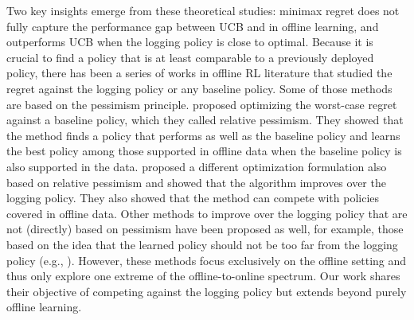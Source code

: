 Two key insights emerge from these theoretical studies:
minimax regret does not fully capture the performance gap between UCB and \alglcb in offline learning, and \alglcb outperforms UCB when the logging policy is close to optimal. 
Because it is crucial to find a policy that is at least comparable to a previously deployed policy, there has been a series of works in offline RL literature that studied the regret against the logging policy or any baseline policy. Some of those methods are based on the pessimism principle. \cite{xie2022armormodelbasedframeworkimproving} proposed optimizing the worst-case regret against a baseline policy, which they called relative pessimism. They showed that the method finds a policy that performs as well as the baseline policy and learns the best policy among those supported in offline data when the baseline policy is also supported in the data. \cite{cheng2022adversarially} proposed a different optimization formulation also based on relative pessimism and showed that the algorithm improves over the logging policy. They also showed that the method can compete with policies covered in offline data. Other methods to improve over the logging policy that are not (directly) based on pessimism have been proposed as well, for example, those based on the idea that the learned policy should not be too far from the logging policy (e.g., \citealt{fujimoto2021minimalist}). However, these methods focus exclusively on the offline setting and thus only explore one extreme of the offline-to-online spectrum. Our work shares their objective of competing against the logging policy but extends beyond purely offline learning.  

